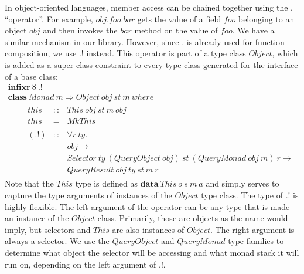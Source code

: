 In object-oriented languages, member access can be chained together using the $.$ ``operator''. For example, $\mathit{obj}.\mathit{foo}.\mathit{bar}$ gets the value of a field $\mathit{foo}$ belonging to an object $\mathit{obj}$ and then invokes the $\mathit{bar}$ method on the value of $\mathit{foo}$. We have a similar mechanism in our library. However, since $.$ is already used for function composition, we use $.!$ instead. This operator is part of a type class $\mathit{Object}$, which is added as a super-class constraint to every type class generated for the interface of a base class:
\begin{displaymath}
\begin{array}{l}
\mathbf{infixr}~8~.!\\
\mathbf{class}~\mathit{Monad}~m \Rightarrow \mathit{Object}~\mathit{obj}~\mathit{st}~m~\mathit{where} \\
\qquad \begin{array}{lcl}
\mathit{this} & :: & \mathit{This}~\mathit{obj}~\mathit{st}~\mathit{m}~\mathit{obj} \\
\mathit{this} & = & \mathit{MkThis} \\\\

(.!) & :: & \forall r~\mathit{ty}.\\ 
     &    & \mathit{obj} \to \\
     &    & \mathit{Selector}~\mathit{ty}~(\mathit{QueryObject}~\mathit{obj})~\mathit{st}~(\mathit{QueryMonad}~\mathit{obj}~\mathit{m})~r \to  \\
     &    & \mathit{QueryResult}~\mathit{obj}~\mathit{ty}~\mathit{st}~m~r
\end{array}
\end{array}
\end{displaymath}
Note that the $\mathit{This}$ type is defined as $\mathbf{data}~\mathit{This}~o~s~m~a$ and simply serves to capture the type arguments of instances of the $\mathit{Object}$ type class. The type of $.!$ is highly flexible. The left argument of the operator can be any type that is made an instance of the $\mathit{Object}$ class. Primarily, those are objects as the name would imply, but selectors and $\mathit{This}$ are also instances of $\mathit{Object}$. The right argument is always a selector. We use the $\mathit{QueryObject}$ and $\mathit{QueryMonad}$ type families to determine what object the selector will be accessing and what monad stack it will run on, depending on the left argument of $.!$.

